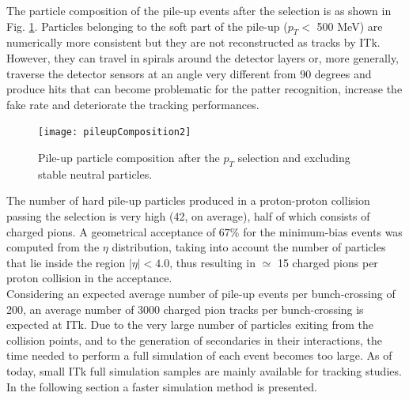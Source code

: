 \documentclass[a4paper,twoside,12pt]{book}
\begin{document}
The particle composition of the pile-up events after the selection is as shown in Fig.
\ref{fig:pileupComposition}. Particles belonging to the soft part of the pile-up ($p_{T} <$ 500 MeV) are numerically more consistent but 
they are not reconstructed as tracks by ITk. However, they can travel in spirals around the 
detector layers or, more generally, traverse the detector sensors at an angle very different
from 90 degrees and produce hits that can become problematic for the patter recognition, increase the fake rate and deteriorate the tracking
performances. \\

\begin{figure} [h]
	\texttt{[image: pileupComposition2]}
	\caption{Pile-up particle composition after the $p_{T}$ selection and excluding stable neutral particles.}
	\label{fig:pileupComposition}
\end{figure}

The number of hard pile-up particles produced in a proton-proton collision passing the selection is very high (42, on average), 
half of which consists of charged pions. A geometrical acceptance of $67\%$ for the minimum-bias events was computed from the $\eta$ distribution, taking into account the number of particles that 
lie inside the region $|\eta| < 4.0$, thus resulting in $\simeq$ 15 charged pions per proton collision in 
the acceptance.\\

Considering an expected average number of pile-up events per bunch-crossing of 200, an average number of 3000 charged pion tracks per bunch-crossing is expected at ITk.
Due to the very large number of particles exiting from the collision points, and to the generation of secondaries in their interactions, the time
needed to perform a full simulation of each event becomes too large.
As of today, small ITk full simulation samples are mainly available for tracking studies. In the following section a faster simulation method is presented.
\end{document}
